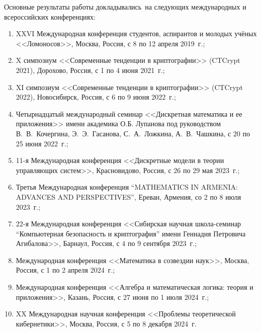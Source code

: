 {\probation}
Основные результаты работы докладывались~на следующих международных и всероссийских конференциях:
\begin{enumerate}
    \item XXVI Международная конференция студентов, аспирантов и молодых учёных <<Ломоносов>>, Москва, Россия, с 8 по 12 апреля 2019~г.;

    \item X симпозиум <<Современные тенденции в криптографии>> (CTCrypt 2021), Дорохово, Россия, с 1 по 4 июня 2021~г.;

    \item XI симпозиум <<Современные тенденции в криптографии>> (CTCrypt 2022), Новосибирск, Россия, с 6 по 9 июня 2022~г.;

    \item Четырнадцатый международный семинар <<Дискретная математика и ее приложения>> имени академика О.Б. Лупанова под руководством В.~В.~Кочергина, Э.~Э.~Гасанова, С.~А.~Ложкина, А.~В.~Чашкина, с 20 по 25 июня 2022~г.;

    \item 11-я Международная конференция <<Дискретные модели в теории управляющих систем>>, Красновидово, Россия, с 26 по 29 мая 2023~г.;

    \item Третья Международная конференция ``MATHEMATICS IN ARMENIA: ADVANCES AND PERSPECTIVES'', Ереван, Армения, со 2 по 8 июля 2023~г.;

    \item 22-я Международная конференция <<Сибирская научная школа-семинар ``Компьютерная безопасность и криптография'' имени Геннадия Петровича Агибалова>>, Барнаул, Россия, с 4 по 9 сентября 2023~г.;

    \item Международная конференция <<Математика в созвездии наук>>, Москва, Россия, с 1 по 2 апреля 2024~г.;

    \item Международная конференция <<Алгебра и математическая логика: теория и приложения>>, Казань, Россия, с 27 июня по 1 июля 2024~г.;

    \item XX Международная научная конференция <<Проблемы теоретической кибернетики>>, Москва, Россия, с 5 по 8 декабря 2024~г.
\end{enumerate}

